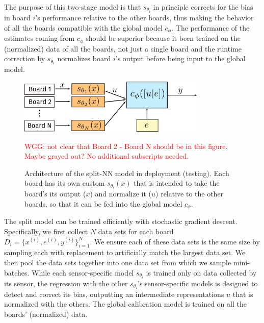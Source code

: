\documentclass[journal abbreviation, manuscript]{copernicus}
\newcommand\todo[1]{\textcolor{red}{#1}}
\begin{document}
The purpose of this two-stage model is that $s_{\theta_i}$ in principle corrects for the bias in board $i$'s performance relative to the other boards, thus making the behavior of all the boards compatible with the global model $c_\phi$.  The performance of the estimates coming from $c_\phi$ should be superior because it been trained on the (normalized) data of all the boards, not just a single board and the runtime correction by $s_{\theta_i}$ normalizes board $i$'s output before being input to the global model.

\begin{figure}
    \includegraphics[width=0.8\textwidth]{writeup/img/split-model.png}
    \caption{Architecture of the split-NN model in deployment (testing).  Each board has its own custom $s_{\theta_i}(x)$ that is intended to take the board's its output ($x$) and normalize it ($u$) relative to the other boards, so that it can be fed into the global model $c_\phi$.}
    \label{fig:split-nn-deploy}
    \todo{WGG: not clear that Board 2 - Board N should be in this figure.  Maybe grayed out?  No additional subscripts needed.}
\end{figure}

The split model can be trained efficiently with stochastic gradient descent. Specifically, we first collect $N$ data sets for each board $D_i = \{x^{(i)}, e^{(i)}, y^{(i)}\}_{i = 1}^N$. We ensure each of these data sets is the same size by sampling each with replacement to artificially match the largest data set. We then pool the data sets together into one data set from which we sample mini-batches. While each sensor-specific model $s_{\theta_i}$ is trained only on data collected by its sensor, the regression with the other $s_{\theta_i}$'s sensor-specific models is designed to detect and correct its bias, outputting an intermediate representations $u$ that is normalized with the others.  The global calibration model is trained on all the boards' (normalized) data.

\end{document}

